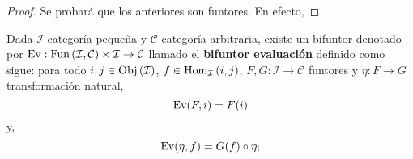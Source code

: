\documentclass[12pt]{report}
\newcounter{it}
\theoremstyle{largebreak}
\newcommand\cf[3]{\ensuremath{#1:#2\rightarrow#3}}
\newcommand{\Obj}[1]{\ensuremath{\textup{Obj}\left(#1\right)}}
\newcommand{\Hom}[3]{\ensuremath{\textup{Hom}_{#1}\left(#2,#3\right)}}
\newcommand{\Fun}[2]{\ensuremath{\textup{Fun}\left(#1,#2\right)}}
\newcommand{\Ev}{\ensuremath{\textup{Ev}}}
\begin{document}
    \begin{proof}
        Se probará que los anteriores son funtores. En efecto,
    \end{proof}

    \begin{mydef}
        Dada $\mathcal{I}$ categoría pequeña y $\mathcal{C}$ categoría arbitraria, existe un bifuntor denotado por $\cf{\Ev}{\Fun{\mathcal{I}}{\mathcal{C}}\times\mathcal{I}}{\mathcal{C}}$ llamado el \textbf{bifuntor evaluación} definido como sigue: para todo $i,j\in\Obj{\mathcal{I}}$, $f\in\Hom{\mathcal{I}}{i}{j}$, $\cf{F,G}{\mathcal{I}}{\mathcal{C}}$ funtores y $\cf{\eta}{F}{G}$ transformación natural,
        \begin{equation*}
            \Ev(F,i)=F(i)
        \end{equation*}
        y,
        \begin{equation*}
            \Ev(\eta,f)=G(f)\circ\eta_i
        \end{equation*}
    \end{mydef}
\end{document}
